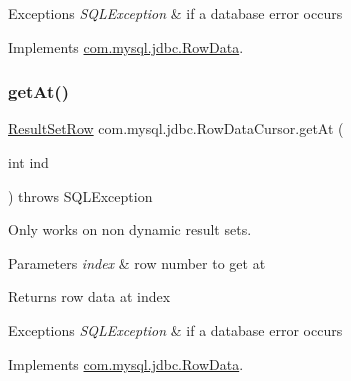 \begin{DoxyExceptions}{Exceptions}
{\em S\+Q\+L\+Exception} & if a database error occurs \\
\hline
\end{DoxyExceptions}


Implements \mbox{\hyperlink{interfacecom_1_1mysql_1_1jdbc_1_1_row_data_ac548da95fe41cee544964af3b6d734a6}{com.\+mysql.\+jdbc.\+Row\+Data}}.

\mbox{\label{classcom_1_1mysql_1_1jdbc_1_1_row_data_cursor_a0027f3f5693ea4392c71528296e25e86}} 
\subsubsection{\texorpdfstring{get\+At()}{getAt()}}
{\footnotesize\ttfamily \mbox{\hyperlink{classcom_1_1mysql_1_1jdbc_1_1_result_set_row}{Result\+Set\+Row}} com.\+mysql.\+jdbc.\+Row\+Data\+Cursor.\+get\+At (\begin{DoxyParamCaption}\item[{int}]{ind }\end{DoxyParamCaption}) throws S\+Q\+L\+Exception}

Only works on non dynamic result sets.


\begin{DoxyParams}{Parameters}
{\em index} & row number to get at \\
\hline
\end{DoxyParams}
\begin{DoxyReturn}{Returns}
row data at index 
\end{DoxyReturn}

\begin{DoxyExceptions}{Exceptions}
{\em S\+Q\+L\+Exception} & if a database error occurs \\
\hline
\end{DoxyExceptions}


Implements \mbox{\hyperlink{interfacecom_1_1mysql_1_1jdbc_1_1_row_data_a25cc7589897136ff05959212ce3e9063}{com.\+mysql.\+jdbc.\+Row\+Data}}.

\mbox{\label{classcom_1_1mysql_1_1jdbc_1_1_row_data_cursor_aaa74825dc4ae9b34d7b36e8aec089227}} 
